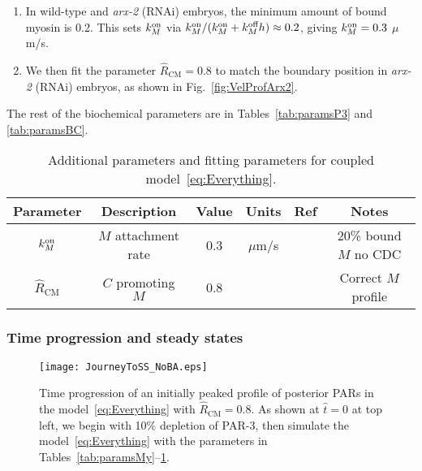 \documentclass[11pt]{article}
\newcommand{\6}[1]{#1_{\text{6}}}
\newcommand{\3}[1]{#1_{\text{3}}}
\begin{document}
\begin{enumerate}
\item In wild-type and \emph{arx-2} (RNAi) embryos, the minimum amount of bound myosin is 0.2. This sets $k^\text{on}_M$ via $k^\text{on}_M/(k^\text{on}_M+k^\text{off}_M h) \approx 0.2$, giving $k^\text{on}_M=0.3$ $\mu$m/s.
\item We then fit the parameter $\hat R_\text{CM}=0.8$ to match the boundary position in \emph{arx-2} (RNAi) embryos, as shown in Fig.\ \ref{fig:VelProfArx2}.
\end{enumerate}
The rest of the biochemical parameters are in Tables\ \ref{tab:paramsP3} and \ref{tab:paramsBC}.

\begin{table}
\begin{small}
\centering
\begin{tabular}{|c|c|c|c|c|c|}\hline
Parameter & Description & Value & Units & Ref & Notes \\ \hline
$k^\text{on}_M$ & $M$ attachment rate & 0.3 & $\mu$m/s & & 20\% bound $M$ no CDC \\
$\hat R_\text{CM}$ & $C$ promoting $M$ & 0.8 & &  & Correct $M$ profile\\ \hline
\end{tabular}
\caption{\label{tab:paramsC} Additional parameters and fitting parameters for coupled model\ \eqref{eq:Everything}.}
\end{small}
\end{table}


\subsubsection{Time progression and steady states}

\begin{figure}
\centering
\texttt{[image: JourneyToSS\_NoBA.eps]}
\caption{\label{fig:TimeSeqNoBA} Time progression of an initially peaked profile of posterior PARs in the model\ \eqref{eq:Everything} with $\hat R_\text{CM}=0.8$. As shown at $\hat t=0$ at top left, we begin with 10\% depletion of PAR-3, then simulate the model\ \eqref{eq:Everything} with the parameters in Tables\ \ref{tab:paramsMy}--\ref{tab:paramsC}.}
\end{figure}
\end{document}

